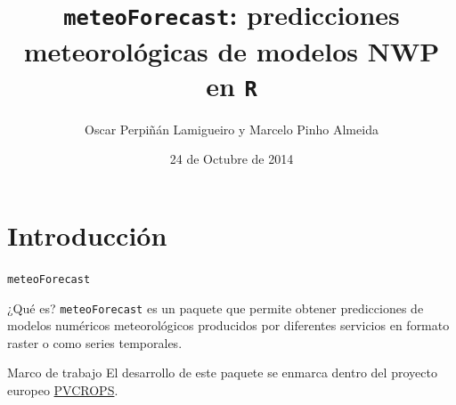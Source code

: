 \documentclass[xcolor={usenames,svgnames,dvipsnames}]{beamer}
\author{Oscar Perpiñán Lamigueiro y Marcelo Pinho Almeida}
\date{24 de Octubre de 2014}
\title{\texttt{meteoForecast}: predicciones meteorológicas de modelos NWP en \texttt{R}}
\begin{document}
\maketitle

\section{Introducción}
\label{sec-1}

\begin{frame}[fragile,label=sec-1-1]{\texttt{meteoForecast}}
 \begin{block}{¿Qué es?}
\texttt{meteoForecast} es un paquete que permite obtener predicciones de
modelos numéricos meteorológicos producidos por diferentes servicios
en formato raster o como series temporales.
\end{block}

\begin{block}{Marco de trabajo}
El desarrollo de este paquete se enmarca dentro del proyecto europeo
\href{http://www.pvcrops.eu/project-deliverables}{PVCROPS}.
\end{block}
\end{frame}
\end{document}
